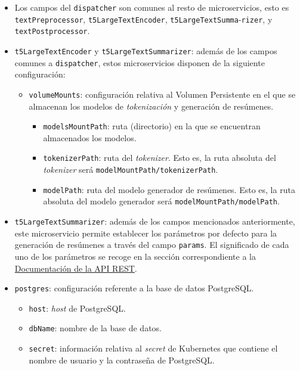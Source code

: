 \begin{itemize} [\textbullet]
	\item Los campos del \texttt{dispatcher} son comunes al resto de microservicios, esto es \texttt{textPreprocessor}, \texttt{t5LargeTextEncoder}, \texttt{t5LargeTextSumma}-\texttt{rizer}, y \texttt{textPostprocessor}.
	
	\item \texttt{t5LargeTextEncoder} y \texttt{t5LargeTextSummarizer}: además de los campos comunes a \texttt{dispatcher}, estos microservicios disponen de la siguiente configuración:
	\begin{itemize} [◦]
		\item \texttt{volumeMounts}: configuración relativa al Volumen Persistente en el que se almacenan los modelos de \emph{tokenización} y generación de resúmenes.
		\begin{itemize} [-]
			\item \texttt{modelsMountPath}: ruta (directorio) en la que se encuentran almacenados los modelos.
			
			\item \texttt{tokenizerPath}: ruta del \emph{tokenizer}. Esto es, la ruta absoluta del \emph{tokenizer} será \texttt{modelMountPath/tokenizerPath}.
			
			\item \texttt{modelPath}: ruta del modelo generador de resúmenes. Esto es, la ruta absoluta del modelo generador será \texttt{modelMountPath/\newline modelPath}.
		\end{itemize}
	\end{itemize}	
		
	\item \texttt{t5LargeTextSummarizer}: además de los campos mencionados anteriormente, este microservicio permite establecer los parámetros por defecto para la generación de resúmenes a través del campo \texttt{params}. El significado de cada uno de los parámetros se recoge en la sección correspondiente a la \hyperref[subsection:api-docs]{Documentación de la API REST}.

	\item \texttt{postgres}: configuración referente a la base de datos PostgreSQL.
	
	\begin{itemize} [◦]
		\item \texttt{host}: \emph{host} de PostgreSQL.
		\item \texttt{dbName}: nombre de la base de datos.
		\item \texttt{secret}: información relativa al \emph{secret} de Kubernetes que contiene el nombre de usuario y la contraseña de PostgreSQL.
	\end{itemize}


\end{itemize}
